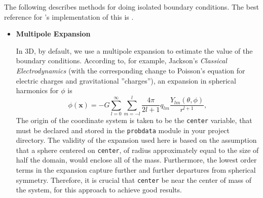 The following describes methods for doing isolated boundary
conditions.  The best reference for \castro's implementation of this
is \cite{katz:2016}.

\begin{itemize}
\item \textbf{Multipole Expansion}

In 3D, by default, we use a multipole expansion to estimate the value
of the boundary conditions. According to, for example, Jackson's
\textit{Classical Electrodynamics} (with the corresponding change to
Poisson's equation for electric charges and gravitational
''charges''), an expansion in spherical harmonics for $\phi$ is
\begin{equation}
  \phi(\mathbf{x}) = -G\sum_{l=0}^{\infty}\sum_{m=-l}^{l} \frac{4\pi}{2l + 1} q_{lm} \frac{Y_{lm}(\theta,\phi)}{r^{l+1}}, \label{spherical_harmonic_expansion}
\end{equation}
The origin of the coordinate system is taken to be the \texttt{center}
variable, that must be declared and stored in the \texttt{probdata}
module in your project directory. The validity of the expansion used
here is based on the assumption that a sphere centered on
\texttt{center}, of radius approximately equal to the size of half the
domain, would enclose all of the mass. Furthermore, the lowest order
terms in the expansion capture further and further departures from
spherical symmetry. Therefore, it is crucial that \texttt{center} be
near the center of mass of the system, for this approach to achieve
good results.


\end{itemize}
